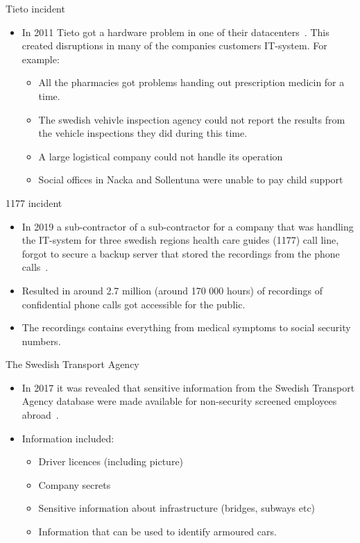 \documentclass{beamer}
\begin{document}
\begin{frame}{Tieto incident}
  \begin{itemize}
    \item In 2011 Tieto got a hardware problem in one of their
      datacenters~\cite{Lindkvist2012tdf}. This created disruptions in many of
      the companies customers IT-system. For example: 
      \begin{itemize}
        \item All the pharmacies got problems handing out prescription medicin for a
          time.
        \item The swedish vehivle inspection agency could not report the results
          from the vehicle inspections they did during this time.
        \item A large logistical company could not handle its operation
        \item Social offices in Nacka and Sollentuna were unable to pay child
          support
      \end{itemize}
  \end{itemize}
\end{frame}
\begin{frame}{1177 incident}
  \begin{itemize}
    \item In 2019 a sub-contractor of a sub-contractor for a company that was
      handling the IT-system for three swedish regions health care guides (1177)
      call line, forgot to secure a backup server that stored the recordings
      from the phone calls~\cite{Ottsjo2019}.
    \item Resulted in around 2.7 million (around 170 000 hours) of recordings of
      confidential phone calls got accessible for the public.
    \item The recordings contains everything from medical symptoms to social
      security numbers.
  \end{itemize}
\end{frame}
\begin{frame}{The Swedish Transport Agency}
  \begin{itemize}
    \item In 2017 it was revealed that sensitive information from the Swedish
      Transport Agency database were made available for non-security screened
      employees abroad~\cite{SvTTransport2017}. 
    \item Information included:
      \begin{itemize}
        \item Driver licences (including picture)
        \item Company secrets
        \item Sensitive information about infrastructure (bridges, subways etc)
        \item Information that can be used to identify armoured cars.
      \end{itemize}
  \end{itemize}
\end{frame}
\end{document}
